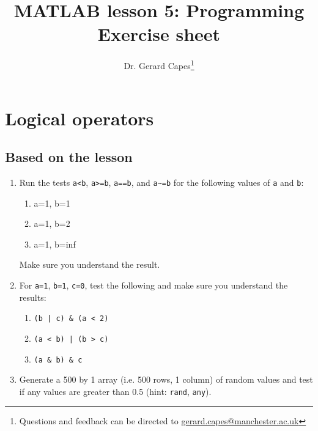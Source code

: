 \documentclass{article}
\title{MATLAB lesson 5: Programming\\Exercise sheet}
\date{}
\author{Dr. Gerard Capes\thanks{Questions and feedback can be directed to \href{mailto:gerard.capes@manchester.ac.uk?subject=Feedback on MATLAB lesson 5 (programming) exercise sheet}{gerard.capes@manchester.ac.uk}}}
\begin{document}
	\maketitle
	
	\section{Logical operators}
	\subsection*{Based on the lesson}
	\begin{enumerate}
		\item Run the tests \texttt{a<b}, \texttt{a>=b}, \texttt{a==b}, and \texttt{a\textasciitilde=b} for the following values of \texttt{a} and \texttt{b}:
		
		\begin{enumerate}
			\item a=1, b=1
			\item a=1, b=2
			\item a=1, b=inf
		\end{enumerate}
		Make sure you understand the result.
		\item For \texttt{a=1}, \texttt{b=1}, \texttt{c=0}, test the following and make sure you understand the results:
		\begin{enumerate}
			\item \texttt{(b | c) \& (a < 2)}
			\item \texttt{(a < b) | (b > c)}
			\item \texttt{(a \& b) \& c}
		\end{enumerate}	
		\item Generate a 500 by 1 array (i.e. 500 rows, 1 column) of random values and test if any values are greater than 0.5 (hint: \texttt{rand}, \texttt{any}).
	\end{enumerate}	
\end{document}
